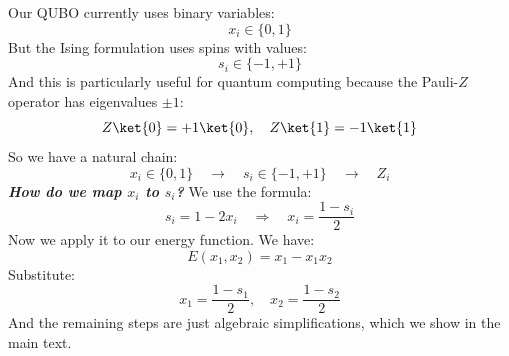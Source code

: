 \begin{deepeningbox}
    Our QUBO currently uses binary variables:
    \begin{equation*}
        x_i \in \{0,1\}
    \end{equation*}
    But the Ising formulation uses spins with values:
    \begin{equation*}
        s_i \in \{-1,+1\}
    \end{equation*}
    And this is particularly useful for quantum computing because the Pauli-$Z$ operator has eigenvalues $\pm 1$:
    \begin{equation*}
        Z\ket{0} = +1\ket{0}, \quad Z\ket{1} = -1\ket{1}
    \end{equation*}
    So we have a natural chain:
    \begin{equation*}
        x_i \in \{0,1\} \quad \to \quad s_i \in \{-1,+1\} \quad \to \quad Z_i
    \end{equation*}
    \emph{\textbf{How do we map $x_i$ to $s_i$?}} We use the formula:
    \begin{equation*}
        s_i = 1 - 2x_i \quad \Rightarrow \quad x_i = \frac{1 - s_i}{2}
    \end{equation*}
    Now we apply it to our energy function. We have:
    \begin{equation*}
        E(x_1, x_2) = x_1 - x_1 x_2
    \end{equation*}
    Substitute:
    \begin{equation*}
        x_1 = \frac{1 - s_1}{2}, \quad x_2 = \frac{1 - s_2}{2}
    \end{equation*}
    And the remaining steps are just algebraic simplifications, which we show in the main text.
\end{deepeningbox}


